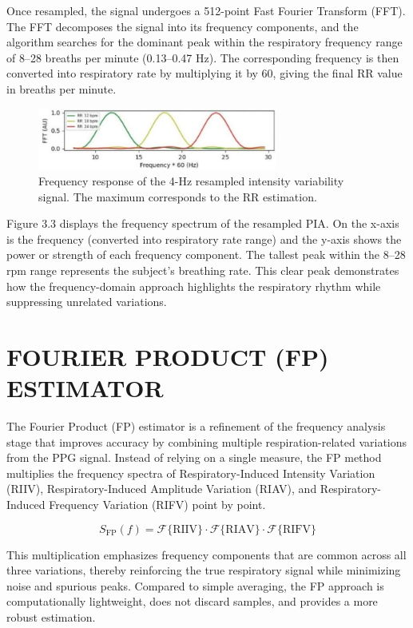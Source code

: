 \documentclass[12pt,a4paper]{report}
\begin{document}
 Once resampled, the signal undergoes a 512-point Fast Fourier Transform (FFT). The FFT decomposes the signal into its frequency components, and the algorithm searches for the dominant peak within the respiratory frequency range of 8–28 breaths per minute (0.13–0.47 Hz). The corresponding frequency is then converted into respiratory rate by multiplying it by 60, giving the final RR value in breaths per minute.\\
\begin{figure}[H]
    \centering
    \includegraphics[width=0.7\textwidth]{resampling.jpg}
    \caption{Frequency response of the 4-Hz resampled intensity variability signal. The maximum corresponds to the RR estimation.
}
    \label{5.10cm}
\end{figure}
 Figure 3.3 displays the frequency spectrum of the resampled PIA. On the x-axis is the frequency (converted into respiratory rate range) and the y-axis shows the power or strength of each frequency component. The tallest peak within the 8–28 rpm range represents the subject’s breathing rate. This clear peak demonstrates how the frequency-domain approach highlights the respiratory rhythm while suppressing unrelated variations.
\\
\section{\large{FOURIER PRODUCT (FP) ESTIMATOR}}
 The Fourier Product (FP) estimator is a refinement of the frequency analysis stage that improves accuracy by combining multiple respiration-related variations from the PPG signal. Instead of relying on a single measure, the FP method multiplies the frequency spectra of Respiratory-Induced Intensity Variation (RIIV), Respiratory-Induced Amplitude Variation (RIAV), and Respiratory-Induced Frequency Variation (RIFV) point by point.

    \begin{equation}
S_{\text{FP}}(f) = \mathcal{F}\{\text{RIIV}\} \cdot \mathcal{F}\{\text{RIAV}\} \cdot \mathcal{F}\{\text{RIFV}\}
\end{equation}
    

 This multiplication emphasizes frequency components that are common across all three variations, thereby reinforcing the true respiratory signal while minimizing noise and spurious peaks. Compared to simple averaging, the FP approach is computationally lightweight, does not discard samples, and provides a more robust estimation.
\end{document}

